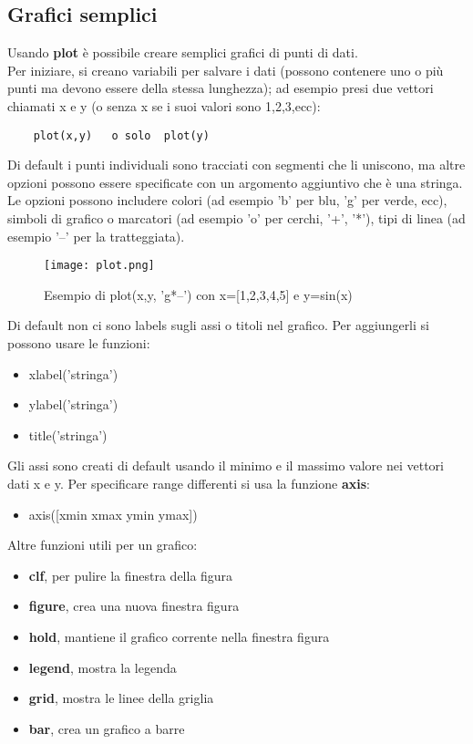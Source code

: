 \documentclass[a4paper, 10pt]{article}
\begin{document}
\subsection{Grafici semplici}
Usando \textbf{plot} è possibile creare semplici grafici di punti di dati.\\
Per iniziare, si creano variabili per salvare i dati (possono contenere uno o più punti ma devono essere della stessa lunghezza); ad esempio presi due vettori chiamati x e y (o senza x se i suoi valori sono 1,2,3,ecc):
\begin{lstlisting}
	plot(x,y)	o solo	plot(y)
\end{lstlisting}
Di default i punti individuali sono tracciati con segmenti che li uniscono, ma altre opzioni possono essere specificate con un argomento aggiuntivo che è una stringa. Le opzioni possono includere colori (ad esempio 'b' per blu, 'g' per verde, ecc), simboli di grafico o marcatori (ad esempio 'o' per cerchi, '+', '*'), tipi di linea (ad esempio '--' per la tratteggiata).\\
\begin{figure}[!h]
\begin{center}
\texttt{[image: plot.png]}
\caption{Esempio di plot(x,y, 'g*--') con x=[1,2,3,4,5] e y=sin(x)}
\end{center}
\end{figure}

Di default non ci sono labels sugli assi o titoli nel grafico. Per aggiungerli si possono usare le funzioni:
\begin{itemize}
\item xlabel('stringa')
\item ylabel('stringa')
\item title('stringa')
\end{itemize}
Gli assi sono creati di default usando il minimo e il massimo valore nei vettori dati x e y. Per specificare range differenti si usa la funzione \textbf{axis}:
\begin{itemize}
\item axis([xmin xmax ymin ymax])
\end{itemize}
Altre funzioni utili per un grafico:
\begin{itemize}
\item \textbf{clf}, per pulire la finestra della figura
\item \textbf{figure}, crea una nuova finestra figura
\item \textbf{hold}, mantiene il grafico corrente nella finestra figura
\item \textbf{legend}, mostra la legenda
\item \textbf{grid}, mostra le linee della griglia
\item \textbf{bar}, crea un grafico a barre
\end{itemize}
\end{document}
